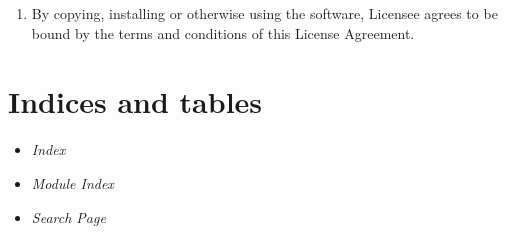 \documentclass[letterpaper,10pt,english]{manual}
\begin{document}
\begin{enumerate}
\item {} 
By copying, installing or otherwise using the software, Licensee agrees to be
bound by the terms and conditions of this License Agreement.

\end{enumerate}


\chapter{Indices and tables}
\begin{itemize}
\item {} 
\emph{Index}

\item {} 
\emph{Module Index}

\item {} 
\emph{Search Page}

\end{itemize}


\renewcommand{\indexname}{Module Index}
\printmodindex
\renewcommand{\indexname}{Index}
\printindex
\end{document}
